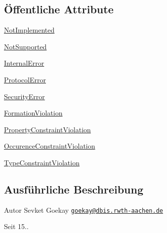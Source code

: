 \subsection*{Öffentliche Attribute}
\begin{DoxyCompactItemize}
\item 
\hyperlink{enumde_1_1rwth_1_1idsg_1_1steve_1_1ocpp_1_1ws_1_1data_1_1_error_code_a34d25307d49fa6540f6c75c3b1ed0a53}{Not\-Implemented}
\item 
\hyperlink{enumde_1_1rwth_1_1idsg_1_1steve_1_1ocpp_1_1ws_1_1data_1_1_error_code_a94565cb30049ccc41aee490a389c65b3}{Not\-Supported}
\item 
\hyperlink{enumde_1_1rwth_1_1idsg_1_1steve_1_1ocpp_1_1ws_1_1data_1_1_error_code_a348da1f31c5e2492079a52f6f27d5ef3}{Internal\-Error}
\item 
\hyperlink{enumde_1_1rwth_1_1idsg_1_1steve_1_1ocpp_1_1ws_1_1data_1_1_error_code_abd8b7dc623499609e00d9c9ac781612f}{Protocol\-Error}
\item 
\hyperlink{enumde_1_1rwth_1_1idsg_1_1steve_1_1ocpp_1_1ws_1_1data_1_1_error_code_a81dab9b92111670de061a4a61aee799d}{Security\-Error}
\item 
\hyperlink{enumde_1_1rwth_1_1idsg_1_1steve_1_1ocpp_1_1ws_1_1data_1_1_error_code_a74855f41c8bddc46b64cfde5987229c9}{Formation\-Violation}
\item 
\hyperlink{enumde_1_1rwth_1_1idsg_1_1steve_1_1ocpp_1_1ws_1_1data_1_1_error_code_a283d2b5462820bb3f4b414c83bdc5ea7}{Property\-Constraint\-Violation}
\item 
\hyperlink{enumde_1_1rwth_1_1idsg_1_1steve_1_1ocpp_1_1ws_1_1data_1_1_error_code_a18f1613d3eedcf25a2e791837290f236}{Occurence\-Constraint\-Violation}
\item 
\hyperlink{enumde_1_1rwth_1_1idsg_1_1steve_1_1ocpp_1_1ws_1_1data_1_1_error_code_a337dab1df5da78a9b46f284ec9414987}{Type\-Constraint\-Violation}
\end{DoxyCompactItemize}


\subsection{Ausführliche Beschreibung}
\begin{DoxyAuthor}{Autor}
Sevket Goekay \href{mailto:goekay@dbis.rwth-aachen.de}{\tt goekay@dbis.\-rwth-\/aachen.\-de} 
\end{DoxyAuthor}
\begin{DoxySince}{Seit}
15.. 
\end{DoxySince}


